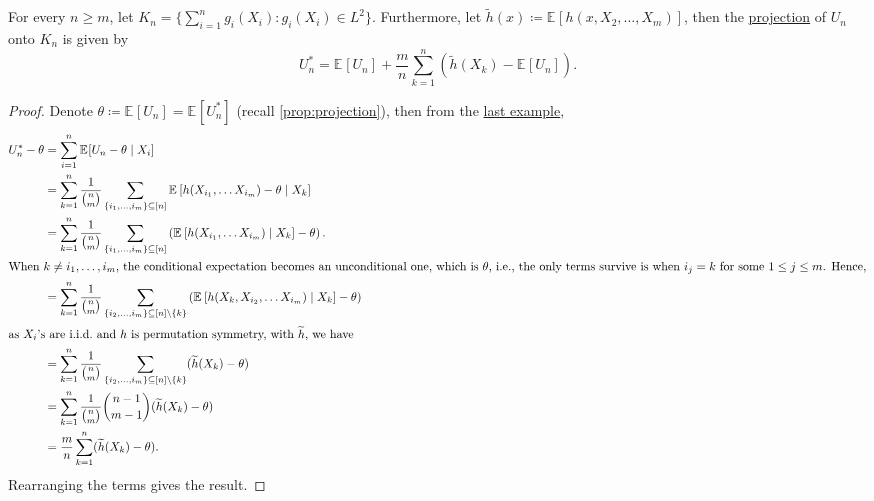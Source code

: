 \begin{proposition}\label{prop:U-statistic-projection}
	For every \(n \geq m\), let \(K_n = \{ \sum_{i=1}^{n} g_i(X_i) \colon g_i(X_i) \in L^2\} \). Furthermore, let \(\widetilde{h} (x) \coloneqq \mathbb{E}_{}[h(x, X_2, \dots , X_m)] \), then the \hyperref[def:projection]{projection} of \(U_n\) onto \(K_n\) is given by
	\[
		U_n^{\ast}
		= \mathbb{E}_{}[U_n] + \frac{m}{n} \sum_{k=1}^{n} (\widetilde{h} (X_k) - \mathbb{E}_{}[U_n] ).
	\]
\end{proposition}
\begin{proof}
	Denote \(\theta \coloneqq \mathbb{E}_{}[U_n] = \mathbb{E}_{}[U_n^{\ast} ] \) (recall \autoref{prop:projection}), then from the \hyperref[eg:projection]{last example},
	\begin{align*}
		U_n^{\ast} - \theta
		 & = \sum_{i=1}^{n} \mathbb{E}_{}[U_n - \theta \mid X_i]                                                                                                                                             \\
		 & = \sum_{k=1}^{n} \frac{1}{\binom{n}{m}} \sum_{\{ i_1, \dots , i_m \} \subseteq [n] } \mathbb{E}_{}\left[h(X_{i_1}, \dots X_{i_m}) - \theta \mid X_k\right]                                        \\
		 & = \sum_{k=1}^{n} \frac{1}{\binom{n}{m}} \sum_{\{ i_1, \dots , i_m \} \subseteq [n] } \left( \mathbb{E}_{}\left[h(X_{i_1}, \dots X_{i_m}) \mid X_k\right] - \theta \right).                        \\
		\shortintertext{When \(k \neq i_1, \dots , i_m\), the conditional expectation becomes an unconditional one, which is \(\theta \), i.e., the only terms survive is when \(i_j = k\) for some \(1 \leq j \leq m\). Hence,}
		 & = \sum_{k=1}^{n} \frac{1}{\binom{n}{m}} \sum_{\{ i_2, \dots , i_m \} \subseteq [n] \setminus \{ k \} } \left( \mathbb{E}_{}\left[h(X_k, X_{i_2}, \dots X_{i_m}) \mid X_k \right] - \theta \right) \\
		\shortintertext{as \(X_i\)'s are i.i.d.\ and \(h\) is permutation symmetry, with \(\widetilde{h} \), we have}
		 & = \sum_{k=1}^{n} \frac{1}{\binom{n}{m}} \sum_{\{ i_2, \dots , i_m \} \subseteq [n] \setminus \{ k \} } ( \widetilde{h} (X_k) - \theta )                                                           \\
		 & =  \sum_{k=1}^{n} \frac{1}{\binom{n}{m}} \binom{n-1}{m-1} ( \widetilde{h} (X_k) - \theta )                                                                                                        \\
		 & = \frac{m}{n} \sum_{k=1}^{n} (\widetilde{h} (X_k) - \theta ).
	\end{align*}
	Rearranging the terms gives the result.
\end{proof}

